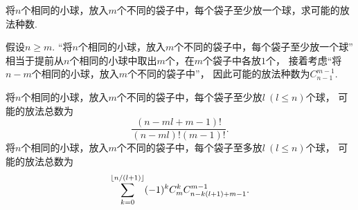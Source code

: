 \begin{example}
将\(n\)个相同的小球，放入\(m\)个不同的袋子中，每个袋子至少放一个球，求可能的放法种数.
\begin{solution}
假设\(n \geq m\).
“将\(n\)个相同的小球，放入\(m\)个不同的袋子中，每个袋子至少放一个球”
相当于提前从\(n\)个相同的小球中取出\(m\)个，在\(m\)个袋子中各放\(1\)个，
接着考虑“将\(n-m\)个相同的小球，放入\(m\)个不同的袋子中”，
因此可能的放法种数为\(C_{n-1}^{m-1}\).
\end{solution}
\end{example}
\begin{remark}
将\(n\)个相同的小球，放入\(m\)个不同的袋子中，每个袋子至少放\(l\ (l \leq n)\)个球，
可能的放法总数为\begin{equation*}
	\frac{(n-ml+m-1)!}{(n-ml)!(m-1)!}.
\end{equation*}
将\(n\)个相同的小球，放入\(m\)个不同的袋子中，每个袋子至多放\(l\ (l \leq n)\)个球，
可能的放法总数为\begin{equation*}
	\sum_{k=0}^{\lfloor n/(l+1)\rfloor} (-1)^k C_m^k C_{n-k(l+1)+m-1}^{m-1}.
\end{equation*}
\end{remark}

